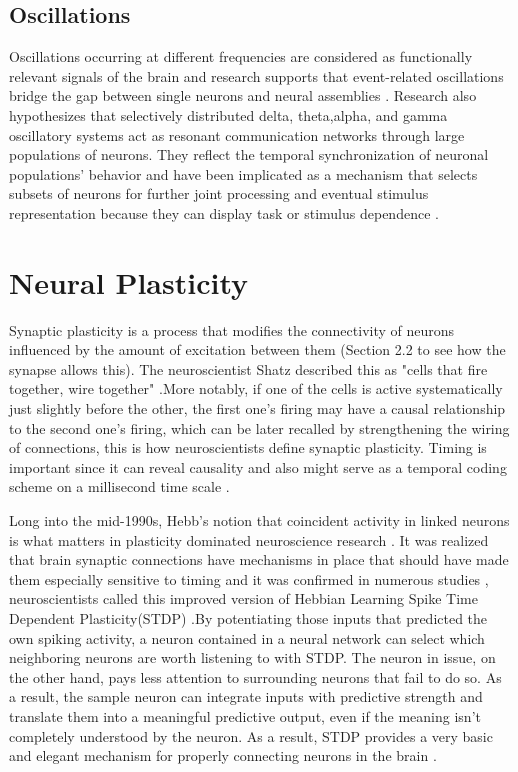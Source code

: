 \documentclass[12pt]{report}
\begin{document}
\subsection{Oscillations}
Oscillations occurring at different frequencies are considered as functionally relevant signals of the brain and research supports that event-related oscillations bridge the gap between single neurons and neural assemblies \cite{Basar2000}. Research also hypothesizes that selectively  distributed delta, theta,alpha, and gamma oscillatory systems act as resonant communication networks through large populations of neurons. They reflect the temporal synchronization of neuronal populations' behavior and have been implicated as a mechanism that selects subsets of neurons for further joint processing and eventual stimulus representation because they can display task or stimulus dependence \cite{Singer1995} \cite{Singer1999}.

\section{Neural Plasticity}
Synaptic plasticity is a process that modifies the connectivity of neurons influenced by the amount of excitation between them (Section 2.2 to see how the synapse allows this). The neuroscientist  Shatz described this as "cells that fire together, wire together" \cite{shatz1992}.More notably, if one of the cells is active systematically just slightly before the other, the first one's firing may have a causal relationship to the second one's firing, which can be later recalled by strengthening the wiring of connections, this is how neuroscientists define synaptic plasticity. Timing is important since it can reveal causality and also might serve as a temporal coding scheme on a millisecond time scale .

Long into the mid-1990s, Hebb's notion that coincident activity in linked neurons is what matters in plasticity dominated neuroscience research . It was realized that brain synaptic connections have mechanisms in place that should have made them especially sensitive to timing and it was confirmed in numerous studies \cite{markram1995}\cite{markram1997}\cite{Gerstner1996}, neuroscientists called this improved version of Hebbian Learning Spike Time Dependent Plasticity(STDP) .By potentiating those inputs that predicted the own spiking activity, a neuron contained in a neural network can select which neighboring neurons are worth listening to with STDP. The neuron in issue, on the other hand, pays less attention to surrounding neurons that fail to do so. As a result, the sample neuron can integrate inputs with predictive strength and translate them into a meaningful predictive output, even if the meaning isn't completely understood by the neuron. As a result, STDP provides a very basic and elegant mechanism for properly connecting neurons in the brain \cite{Markram2012} .
\end{document}
